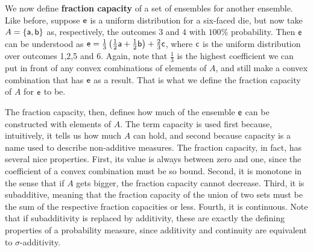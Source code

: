 We now define \textbf{fraction capacity} of a set of ensembles for another ensemble. Like before, suppose $\ens$ is a uniform distribution for a six-faced die, but now take $A = \{ \ens[a], \ens[b] \}$ as, respectively, the outcomes $3$ and $4$ with $100\%$ probability. Then $\ens$ can be understood as $\ens = \frac{1}{3} \left(\frac{1}{2} \ens[a] + \frac{1}{2} \ens[b] \right) + \frac{2}{3} \ens[c]$, where $\ens[c]$ is the uniform distribution over outcomes 1,2,5 and 6. Again, note that $\frac{1}{3}$ is the highest coefficient we can put in front of any convex combinations of elements of $A$, and still make a convex combination that has $\ens$ as a result. That is what we define the fraction capacity of $A$ for $\ens$ to be.

The fraction capacity, then, defines how much of the ensemble $\ens$ can be constructed with elements of $A$. The term capacity is used first because, intuitively, it tells us how much $A$ can hold, and second because capacity is a name used to describe non-additive measures. The fraction capacity, in fact, has several nice properties. First, its value is always between zero and one, since the coefficient of a convex combination must be so bound. Second, it is monotone in the sense that if $A$ gets bigger, the fraction capacity cannot decrease. Third, it is subadditive, meaning that the fraction capacity of the union of two sets must be the sum of the respective fraction capacities or less. Fourth, it is continuous. Note that if subadditivity is replaced by additivity, these are exactly the defining properties of a probability measure, since additivity and continuity are equivalent to $\sigma$-additivity.

